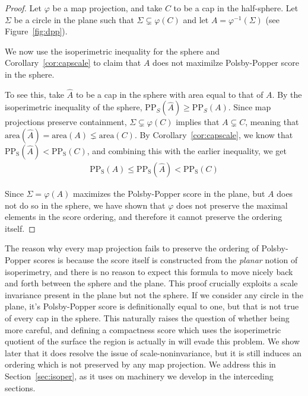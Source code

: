 \begin{proof}
  Let $\varphi$ be a map projection, and take $C$ to be a cap in the
  half-sphere. Let $\Sigma$ be a circle in the plane such that $\Sigma
  \subsetneq \varphi(C)$ and let $A=\varphi^{-1}(\Sigma)$ (see
  Figure~\ref{fig:dpp}).

  We now use the isoperimetric inequality for the sphere 
  and Corollary~\ref{cor:capscale} to claim that 
  $A$ does not maximilze Polsby-Popper score in the sphere.

  To see this, take $\hat{A}$ to be a cap in the sphere with 
  area equal to that of $A$. By the isoperimetric 
  inequality of the sphere, $\mathrm{PP}_S(\hat{A})\geq
  \mathrm{PP}_S(A)$. Since map projections preserve containment,
  $\Sigma\subsetneq \varphi(C)$ implies that $A\subsetneq C$, 
  meaning that $\mathrm{area}(\hat A) = \mathrm{area}(A)\lneq 
  \mathrm{area}(C)$. By Corollary~\ref{cor:capscale}, we know that
  $\mathrm{PP_S}(\hat{A})< \mathrm{PP_S}(C)$, and combining this with
  the earlier inequality, we get
  \begin{align*}
    \mathrm{PP_S}({A})\leq \mathrm{PP_S}(\hat{A})< \mathrm{PP_S}(C)
  \end{align*}

  Since $\Sigma = \varphi(A)$ maximizes the Polsby-Popper score in the
  plane, but $A$ does not do so in the sphere, we have shown that
  $\varphi$ does not preserve the maximal elements in the score
  ordering, and therefore it cannot preserve the ordering itself.
\end{proof}

The reason why every map projection fails to preserve the ordering of
Polsby-Popper scores is because the score itself is constructed from
the \textit{planar} notion of isoperimetry, and there is no reason to
expect this formula to move nicely back and forth between the sphere
and the plane.  This proof crucially exploits a scale invariance
present in the plane but not the sphere.  If we consider any circle in
the plane, it's Polsby-Popper score is definitionally equal to one,
but that is not true of every cap in the sphere.  This naturally
raises the question of whether being more careful, and defining
a compactness score which uses the isoperimetric quotient of the
surface the region is actually in will evade this problem.  We show
later that it does resolve the issue of scale-noninvariance, but it is
still induces an ordering which is not preserved by any map
projection.  We address this in Section~\ref{sec:isoper}, as it uses
on machinery we develop in the interceding sections.
